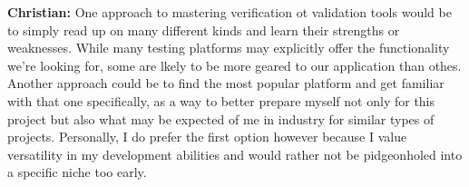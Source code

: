 \documentclass[12pt, titlepage]{article}
\begin{document}
\begin{enumerate}
  \textbf{Christian:} One approach to mastering verification ot validation tools would be to simply read up on many different kinds and learn their strengths or weaknesses. While many testing platforms may explicitly offer the functionality we're looking for, some are lkely to be more geared to our application than othes. Another approach could be to find the most popular platform and get familiar with that one specifically, as a way to better prepare myself not only for this project but also what may be expected of me in industry for similar types of projects. Personally, I do prefer the first option however because I value versatility in my development abilities and would rather not be pidgeonholed into a specific niche too early.
\end{enumerate}
\end{document}
